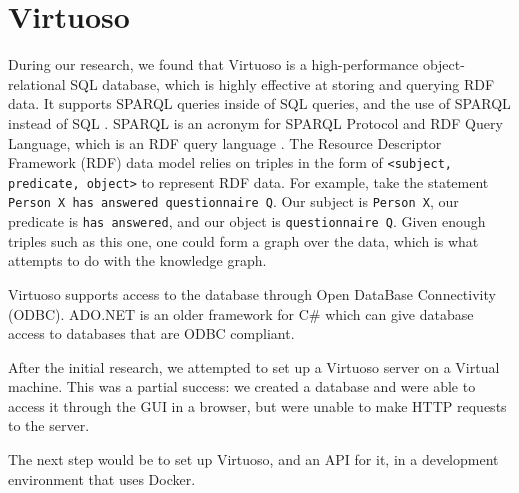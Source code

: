 \section{Virtuoso}
During our research, we found that Virtuoso is a high-performance object-relational SQL database, which is highly effective at storing and querying RDF data. It supports SPARQL queries inside of SQL queries, and the use of SPARQL instead of SQL \cite{VirtuosoDataAcces}. SPARQL is an acronym for SPARQL Protocol and RDF Query Language, which is an RDF query language \cite{WhatIsSPARQL}.
The Resource Descriptor Framework (RDF) data model relies on triples in the form of \texttt{<subject, predicate, object>} to represent RDF data\cite{ResourceDescriptionFramework2021}. For example, take the statement \texttt{Person X has answered questionnaire Q}. Our subject is \texttt{Person X}, our predicate is \texttt{has answered}, and our object is \texttt{questionnaire Q}. Given enough triples such as this one, one could form a graph over the data, which is what \knox{} attempts to do with the knowledge graph.


Virtuoso supports access to the database through Open DataBase Connectivity (ODBC)\cite{VirtuosoODBC}.
ADO.NET is an older framework for C\# which can give database access to databases that are ODBC compliant\cite{AdoOdbc}.

After the initial research, we attempted to set up a Virtuoso server on a Virtual machine. This was a partial success: we created a database and were able to access it through the GUI in a browser, but were unable to make HTTP requests to the server.

The next step would be to set up Virtuoso, and an API for it, in a development environment that uses Docker.